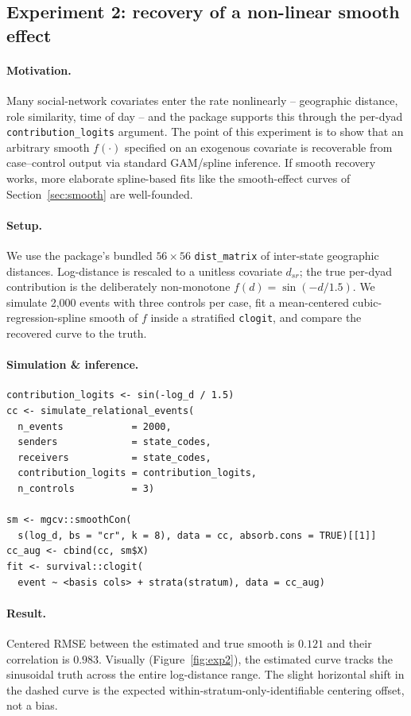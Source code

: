 \documentclass[11pt,a4paper]{article}
\begin{document}
\subsection{Experiment 2: recovery of a non-linear smooth effect}
\label{sec:exp2}

\paragraph{Motivation.}
Many social-network covariates enter the rate nonlinearly --
geographic distance, role similarity, time of day -- and the
package supports this through the per-dyad
\texttt{contribution\_logits} argument. The point of this
experiment is to show that an arbitrary smooth $f(\cdot)$
specified on an exogenous covariate is recoverable from
case--control output via standard GAM/spline inference. If smooth
recovery works, more elaborate spline-based fits like the
smooth-effect curves of Section~\ref{sec:smooth} are well-founded.

\paragraph{Setup.}
We use the package's bundled $56 \times 56$ \texttt{dist\_matrix}
of inter-state geographic distances. Log-distance is rescaled to
a unitless covariate $d_{sr}$; the true per-dyad contribution is
the deliberately non-monotone $f(d) = \sin(-d / 1.5)$. We
simulate 2{,}000 events with three controls per case, fit a
mean-centered cubic-regression-spline smooth of $f$ inside a
stratified \texttt{clogit}, and compare the recovered curve to
the truth.

\paragraph{Simulation \& inference.}
\begin{lstlisting}
contribution_logits <- sin(-log_d / 1.5)
cc <- simulate_relational_events(
  n_events            = 2000,
  senders             = state_codes,
  receivers           = state_codes,
  contribution_logits = contribution_logits,
  n_controls          = 3)

sm <- mgcv::smoothCon(
  s(log_d, bs = "cr", k = 8), data = cc, absorb.cons = TRUE)[[1]]
cc_aug <- cbind(cc, sm$X)
fit <- survival::clogit(
  event ~ <basis cols> + strata(stratum), data = cc_aug)
\end{lstlisting}

\paragraph{Result.}
Centered RMSE between the estimated and true smooth is
$0.121$ and their correlation is $0.983$. Visually
(Figure~\ref{fig:exp2}), the estimated curve tracks the
sinusoidal truth across the entire log-distance range. The
slight horizontal shift in the dashed curve is the expected
within-stratum-only-identifiable centering offset, not a bias.
\end{document}
